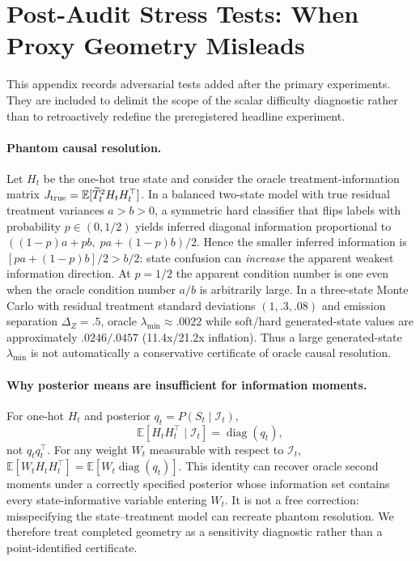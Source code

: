\documentclass[twoside]{article}
\theoremstyle{definition}
\newcommand{\E}{\mathbb{E}}
\begin{document}
\clearpage
\section{Post-Audit Stress Tests: When Proxy Geometry Misleads}
\label{app:postaudit}
This appendix records adversarial tests added after the primary experiments. They are included to delimit the scope of the scalar difficulty diagnostic rather than to retroactively redefine the preregistered headline experiment.

\paragraph{Phantom causal resolution.}
Let $H_t$ be the one-hot true state and consider the oracle treatment-information matrix $J_{\rm true}=\E[\widetilde T_t^2 H_tH_t^\top]$. In a balanced two-state model with true residual treatment variances $a>b>0$, a symmetric hard classifier that flips labels with probability $p\in(0,1/2)$ yields inferred diagonal information proportional to $((1-p)a+pb,\;pa+(1-p)b)/2$. Hence the smaller inferred information is $[pa+(1-p)b]/2>b/2$: state confusion can \emph{increase} the apparent weakest information direction. At $p=1/2$ the apparent condition number is one even when the oracle condition number $a/b$ is arbitrarily large. In a three-state Monte Carlo with residual treatment standard deviations $(1,.3,.08)$ and emission separation $\Delta_Z=.5$, oracle $\lambda_{\min}\approx.0022$ while soft/hard generated-state values are approximately $.0246/.0457$ (11.4x/21.2x inflation). Thus a large generated-state $\lambda_{\min}$ is not automatically a conservative certificate of oracle causal resolution.

\paragraph{Why posterior means are insufficient for information moments.}
For one-hot $H_t$ and posterior $q_t=P(S_t\mid\mathcal I_t)$,
\[
\E[H_tH_t^\top\mid\mathcal I_t]=\operatorname{diag}(q_t),
\]
not $q_tq_t^\top$. For any weight $W_t$ measurable with respect to $\mathcal I_t$,
$\E[W_tH_tH_t^\top]=\E[W_t\operatorname{diag}(q_t)]$.
This identity can recover oracle second moments under a correctly specified posterior whose information set contains every state-informative variable entering $W_t$. It is not a free correction: misspecifying the state--treatment model can recreate phantom resolution. We therefore treat completed geometry as a sensitivity diagnostic rather than a point-identified certificate.
\end{document}
